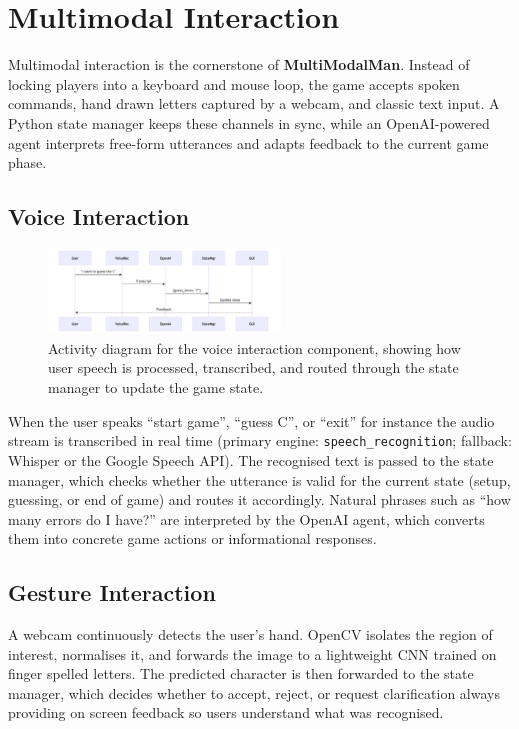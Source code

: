 \section{Multimodal Interaction}

Multimodal interaction is the cornerstone of \textbf{MultiModalMan}. Instead of locking players into a keyboard and mouse loop, the game accepts spoken commands, hand drawn letters captured by a webcam, and classic text input. A Python state manager keeps these channels in sync, while an OpenAI-powered agent interprets free-form utterances and adapts feedback to the current game phase.

\subsection*{Voice Interaction}
\begin{figure}
    \centering
    \includegraphics[width=0.55\textwidth]{./images/voice_interaction_flow.png}
    \caption{Activity diagram for the voice interaction component, showing how user speech is processed, transcribed, and routed through the state manager to update the game state.}
    \label{fig:state_machine}
\end{figure}
When the user speaks “start game”, “guess C”, or “exit” for instance the audio stream is transcribed in real time (primary engine: \texttt{speech\_recognition}; fallback: Whisper or the Google Speech API). The recognised text is passed to the state manager, which checks whether the utterance is valid for the current state (setup, guessing, or end of game) and routes it accordingly. Natural phrases such as “how many errors do I have?” are interpreted by the OpenAI agent, which converts them into concrete game actions or informational responses.

\subsection*{Gesture Interaction}
A webcam continuously detects the user’s hand. OpenCV isolates the region of interest, normalises it, and forwards the image to a lightweight CNN trained on finger spelled letters. The predicted character is then forwarded to the state manager, which decides whether to accept, reject, or request clarification always providing on screen feedback so users understand what was recognised.

